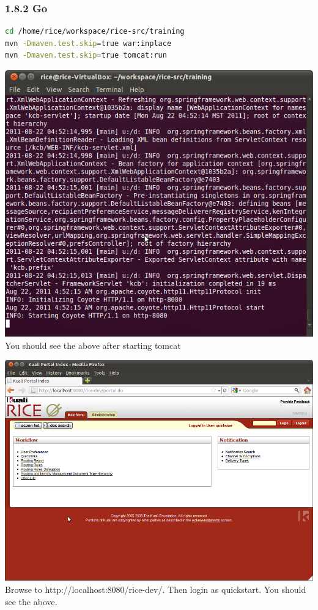 \subsubsection*{1.8.2 Go}
\begin{lstlisting}[language=bash,basicstyle=\scriptsize,backgroundcolor=\color{ubergray},caption={Maven
  commands},frame=single,breaklines=true
]
cd /home/rice/workspace/rice-src/training
mvn -Dmaven.test.skip=true war:inplace
mvn -Dmaven.test.skip=true tomcat:run
\end{lstlisting}

\includegraphics[width=\textwidth]{images/Screenshot10.png}
You should see the above after starting tomcat

\includegraphics[width=\textwidth]{images/Screenshot11.png}
Browse to http://localhost:8080/rice-dev/. Then login as
quickstart. You should see the above.


